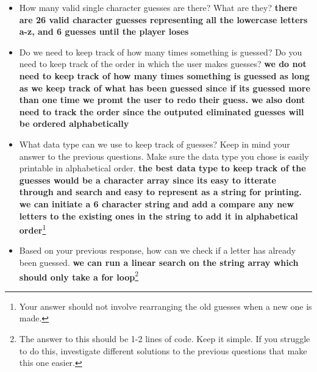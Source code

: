 \documentclass{article}
\begin{document}
\begin{itemize}
    \item How many valid single character guesses are there? What are they? \textbf{there are 26 valid character guesses representing all the lowercase letters a-z, and 6 guesses until the player loses}
    \item Do we need to keep track of how many times something is guessed? Do you need to keep track of the order in which the user makes guesses? \textbf{we do not need to keep track of how many times something is guessed as long as we keep track of what has been guessed since if its guessed more than one time we promt the user to redo their guess. we also dont need to track the order since the outputed eliminated guesses will be ordered alphabetically}
    \item What data type can we use to keep track of guesses? Keep in mind your answer to the previous questions. Make sure the data type you chose is easily printable in alphabetical order. \textbf{the best data type to keep track of the guesses would be a character array since its easy to itterate through and search and easy to represent as a string for printing. we can initiate a 6 character string and add a compare any new letters to the existing ones in the string to add it in alphabetical order}\footnote{Your answer should not involve rearranging the old guesses when a new one is made.}
    \item Based on your previous response, how can we check if a letter has already been guessed. \textbf{we can run a linear search on the string array which should only take a for loop}\footnote{The answer to this should be 1-2 lines of code. Keep it simple. If you struggle to do this, investigate different solutions to the previous questions that make this one easier.}
\end{itemize}
\end{document}
